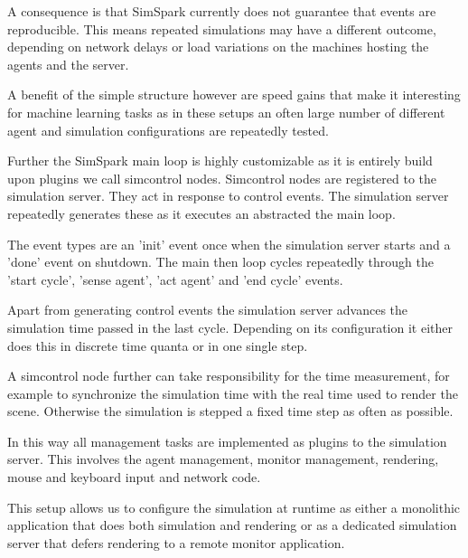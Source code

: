 A consequence is that SimSpark currently does not guarantee that
events are reproducible. This means repeated simulations may have a
different outcome, depending on network delays or load variations on
the machines hosting the agents and the server.

A benefit of the simple structure however are speed gains that make it
interesting for machine learning tasks as in these setups an often
large number of different agent and simulation configurations are
repeatedly tested.

Further the SimSpark main loop is highly customizable as it is
entirely build upon plugins we call simcontrol nodes. Simcontrol nodes
are registered to the simulation server. They act in response to
control events. The simulation server repeatedly generates these as it
executes an abstracted the main loop.

The event types are an 'init' event once when the simulation server
starts and a 'done' event on shutdown. The main then loop cycles
repeatedly through the 'start cycle', 'sense agent', 'act agent' and
'end cycle' events.

Apart from generating control events the simulation server advances
the simulation time passed in the last cycle. Depending on its
configuration it either does this in discrete time quanta or in one
single step.

A simcontrol node further can take responsibility for the time
measurement, for example to synchronize the simulation time with the
real time used to render the scene.  Otherwise the simulation is
stepped a fixed time step as often as possible.

In this way all management tasks are implemented as plugins to the
simulation server. This involves the agent management, monitor
management, rendering, mouse and keyboard input and network code.

This setup allows us to configure the simulation at runtime as either
a monolithic application that does both simulation and rendering or as
a dedicated simulation server that defers rendering to a remote
monitor application.






